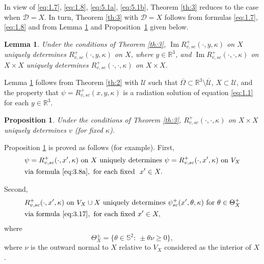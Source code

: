 \documentclass[JEP,XML,SOM,Unicode,NoEqCountersInSection,published]{cedram}
\newcommand{\RR}{\mathbb R}
\renewcommand{\Im}{\mathop{\mathrm{Im}}}
\newtheorem{lemma}{Lemma}
\newtheorem{proposition}{Proposition}
\theoremstyle{definition}
\begin{document}
In view of \eqref{eq:1.7}, \eqref{eq:1.8}, \eqref{eq:5.1a}, \eqref{eq:5.1b}, Theorem \ref{th:3} reduces to the case when $\mathcal{D}=X$.
In turn, Theorem \ref{th:3} with $\mathcal{D}=X$ follows from formulas \eqref{eq:1.7}, \eqref{eq:1.8} and from Lemma \ref{lem:1} and Proposition~\ref{prop:2} given below.

\begin{lemma}\label{lem:1}
Under the conditions of Theorem \ref{th:3}, $\Im R_{v,sc}^+(\cdot, y, \kappa)$ on $X$ uniquely determines $R_{v,sc}^+(\cdot, y, \kappa)$ on $X$,
where $y \in \RR^3$, and $\Im R_{v,sc}^+(\cdot, \cdot, \kappa)$ on $X\times X$ uniquely determines $R_{v,sc}^+(\cdot, \cdot, \kappa)$ on $X\times X$.
\end{lemma}

Lemma \ref{lem:1} follows from Theorem \ref{th:2} with $\mathcal U$ such that $\overline {\Omega} \subset \RR^3\setminus \overline {\mathcal{U}}$, $X \subset \mathcal U$, and
the property that $\psi=R_{v,sc}^+(x, y, \kappa)$ is a radiation solution of equation \eqref{eq:1.1} for each $y\in \RR^3$.

\begin{proposition}\label{prop:2}
Under the conditions of Theorem \ref{th:3}, $R_{v,sc}^+(\cdot, \cdot, \kappa)$ on $X\times X$ uniquely determines $v$ (for fixed $\kappa$).
\end{proposition}

Proposition \ref{prop:2} is proved as follows (for example).
First,
\begin{equation}\label{eq:5.2}
\begin{aligned}
&\psi=R_{v,sc}^+(\cdot, x', \kappa)\text{ on}\ X\text{ uniquely determines}\ \psi=R_{v,sc}^+(\cdot, x', \kappa)\text{ on}\ V_X\\
&\mbox{\rm via formula}\ \eqref{eq:3.8a}, \text{ for each fixed }\ x' \in X.
\end{aligned}
\end{equation}

Second,
\begin{equation}\label{eq:5.3}
\begin{aligned}
&R_{v,sc}^+(\cdot, x', \kappa)\text{ on}\ V_X \cup X\text{ uniquely determines}\ \psi_{sc}^+(x',\theta,\kappa)\text{ for}\ \theta \in \Theta_X^+\\
&\mbox{\rm via formula}\ \eqref{eq:3.17}, \text{ for each fixed}\ x' \in X,
\end{aligned}
\end{equation}
where
\begin{equation}
\label{eq:5.4}
\Theta_X^{\pm}=\{\theta \in\mathbb S^2:\ \pm\theta\nu \geq 0 \},
\end{equation}
where $\nu$ is the outward normal to $X$ relative to $V_X$ considered as the interior of $X$.
\end{document}
